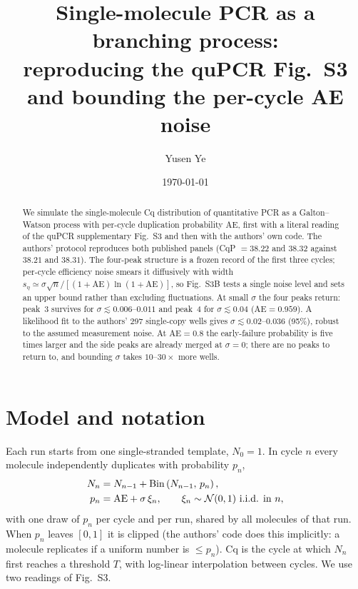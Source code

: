 \documentclass[11pt]{article}
\title{Single-molecule PCR as a branching process:\\
reproducing the quPCR Fig.~S3 and bounding the per-cycle AE noise}
\author{Yusen Ye}
\date{\today}
\newcommand{\AEf}{\mathrm{AE}}
\newcommand{\Cq}{\mathrm{Cq}}
\begin{document}
\maketitle

\begin{abstract}
We simulate the single-molecule Cq distribution of quantitative PCR as a Galton--Watson process
with per-cycle duplication probability $\AEf$, first with a literal reading of the quPCR
supplementary Fig.~S3 and then with the authors' own code. The authors' protocol reproduces
both published panels (CqP $=38.22$ and $38.32$ against $38.21$ and $38.31$). The four-peak
structure is a frozen record of the first three cycles; per-cycle efficiency noise smears it
diffusively with width $s_\eta\simeq\sigma\sqrt{n}/[(1+\AEf)\ln(1+\AEf)]$, so Fig.~S3B tests a
single noise level and sets an upper bound rather than excluding fluctuations. At small
$\sigma$ the four peaks return: peak~3 survives for $\sigma\lesssim0.006$--$0.011$ and peak~4
for $\sigma\lesssim0.04$ ($\AEf=0.959$). A likelihood fit to the authors' 297 single-copy wells
gives $\sigma\lesssim0.02$--$0.036$ (95\%), robust to the assumed measurement noise. At
$\AEf=0.8$ the early-failure probability is five times larger and the side peaks are already
merged at $\sigma=0$; there are no peaks to return to, and bounding $\sigma$ takes
$10$--$30\times$ more wells.
\end{abstract}

\tableofcontents

\section{Model and notation}

Each run starts from one single-stranded template, $N_0=1$. In cycle $n$ every molecule
independently duplicates with probability $p_n$,
\begin{equation}
\begin{aligned}
    N_n &= N_{n-1} + \mathrm{Bin}\p{N_{n-1},\,p_n}, \\
    p_n &= \AEf + \sigma\,\xi_n, \qquad \xi_n\sim\mathcal N(0,1)\ \text{i.i.d. in } n,
\end{aligned}
\label{eq:model}
\end{equation}
with one draw of $p_n$ per cycle and per run, shared by all molecules of that run. When $p_n$
leaves $[0,1]$ it is clipped (the authors' code does this implicitly: a molecule replicates if
a uniform number is $\le p_n$). $\Cq$ is the cycle at which $N_n$ first reaches a threshold
$T$, with log-linear interpolation between cycles. We use two readings of Fig.~S3.
\end{document}

